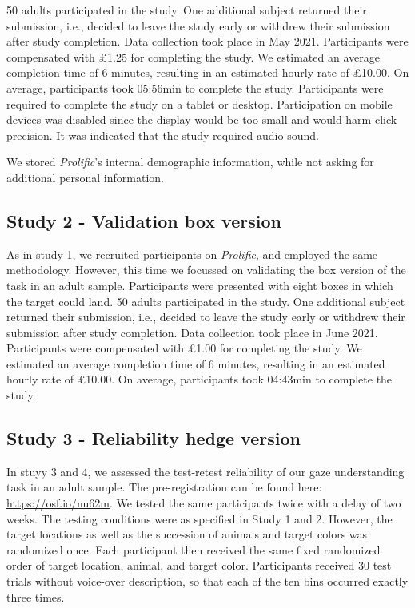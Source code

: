 \documentclass[
  man,floatsintext]{apa6}
\begin{document}
50 adults participated in the study.
One additional subject returned their submission, i.e., decided to leave the study early or withdrew their submission after study completion.
Data collection took place in May 2021.
Participants were compensated with £1.25 for completing the study.
We estimated an average completion time of 6 minutes, resulting in an estimated hourly rate of £10.00.
On average, participants took 05:56min to complete the study.
Participants were required to complete the study on a tablet or desktop.
Participation on mobile devices was disabled since the display would be too small and would harm click precision.
It was indicated that the study required audio sound.

We stored \emph{Prolific}'s internal demographic information, while not asking for additional personal information.

\hypertarget{study-2---validation-box-version}{%
\subsection{Study 2 - Validation box version}\label{study-2---validation-box-version}}

As in study 1, we recruited participants on \emph{Prolific}, and employed the same methodology.
However, this time we focussed on validating the box version of the task in an adult sample.
Participants were presented with eight boxes in which the target could land.
50 adults participated in the study.
One additional subject returned their submission, i.e., decided to leave the study early or withdrew their submission after study completion.
Data collection took place in June 2021.
Participants were compensated with £1.00 for completing the study.
We estimated an average completion time of 6 minutes, resulting in an estimated hourly rate of £10.00.
On average, participants took 04:43min to complete the study.

\hypertarget{study-3---reliability-hedge-version}{%
\subsection{Study 3 - Reliability hedge version}\label{study-3---reliability-hedge-version}}

In stuyy 3 and 4, we assessed the test-retest reliability of our gaze understanding task in an adult sample.
The pre-registration can be found here: \url{https://osf.io/nu62m}.
We tested the same participants twice with a delay of two weeks.
The testing conditions were as specified in Study 1 and 2.
However, the target locations as well as the succession of animals and target colors was randomized once.
Each participant then received the same fixed randomized order of target location, animal, and target color.
Participants received 30 test trials without voice-over description, so that each of the ten bins occurred exactly three times.
\end{document}
